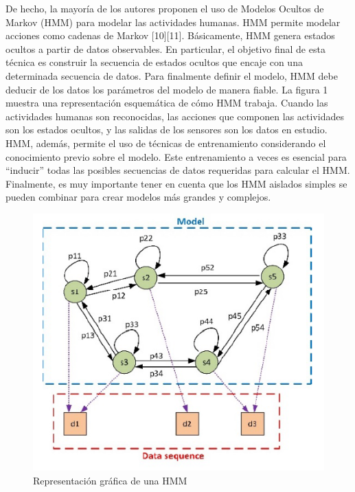 \documentclass{article}
\begin{document}
De hecho, la mayoría de los autores proponen el uso de Modelos Ocultos de Markov (HMM) para modelar las actividades humanas. HMM permite modelar acciones como cadenas de Markov [10][11]. Básicamente, HMM genera estados ocultos a partir de datos observables. En particular, el objetivo final de esta técnica es construir la secuencia de estados ocultos que encaje con una determinada secuencia de datos. Para finalmente definir el modelo, HMM debe deducir de los datos los parámetros del modelo de manera fiable. La figura 1 muestra una representación esquemática de cómo HMM trabaja. Cuando las actividades humanas son reconocidas, las acciones que componen las actividades son los estados ocultos, y las salidas de los sensores son los datos en estudio. HMM, además, permite el uso de técnicas de entrenamiento considerando el conocimiento previo sobre el modelo. Este entrenamiento a veces es esencial para “inducir” todas las posibles secuencias de datos requeridas para calcular el HMM. Finalmente, es muy importante tener en cuenta que los HMM aislados simples se pueden combinar para crear modelos más grandes y complejos.
\begin{figure}[H]
  \centering
  \includegraphics[scale=0.65]{foto1.png}
  \caption{Representación gráfica de una HMM}
\end{figure}
\end{document}
